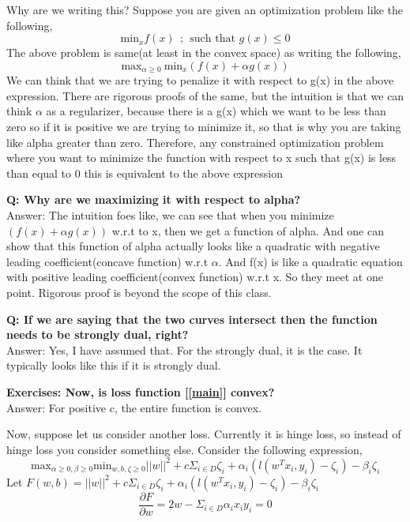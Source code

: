 \documentclass[11pt, twosides]{article}
\begin{document}
Why are we writing this? Suppose you are given an optimization problem like the following, 
\begin{equation*}
    \text{min}_x f(x) \ \ ; \ \ \text{such that } g(x) \leq 0
\end{equation*}
The above problem is same(at least in the convex space) as writing the following,
\begin{equation}
    \text{max}_{\alpha\geq 0} \ \text{min}_x (f(x) + \alpha g(x))
\end{equation} 
We can think that we are trying to penalize it with respect to g(x) in the above expression. There are rigorous proofs of the same, but the intuition is that we can think $\alpha$ as a regularizer, because there is a g(x) which we want to be less than zero so if it is positive we are trying to minimize it, so that is why you are taking like alpha greater than zero. Therefore, any constrained optimization problem where you want to minimize the function with respect to x such that g(x) is less than equal to 0 this is equivalent to the above expression

\textbf{Q: Why are we maximizing it with respect to alpha?} \\
Answer: \color{blue} The intuition foes like, we can see that when you minimize $(f(x) + \alpha g(x))$ w.r.t to x, then we get a function of alpha. And one can show that this function of alpha actually looks like a quadratic with negative leading coefficient(concave function) w.r.t $\alpha$. And f(x) is like a quadratic equation with positive leading coefficient(convex function) w.r.t x. So they meet at one point. Rigorous proof is beyond the scope of this class.
\color{black}

\textbf{Q: If we are saying that the two curves intersect then the function needs to be strongly dual, right? } \\
Answer: \color{blue} Yes, I have assumed that. For the strongly dual, it is the case. It typically looks like this if it is strongly dual.
\color{black}

\textbf{Exercises: Now, is loss function [\ref{main}] convex?} \\
Answer: \color{blue} For positive c, the entire function is convex.

\color{black}

Now, suppose let us consider another loss. Currently it is hinge loss, so instead of hinge loss you consider something else. Consider the following expression,
\begin{equation}
    \text{max}_{\alpha\geq 0, \beta \geq 0} \text{min}_{w,b,\zeta\geq 0} ||w||^2 + c\Sigma_{i\in D}\zeta_i + \alpha_i(l(w^T x_i,y_i)- \zeta_i) - \beta_i\zeta_i
\end{equation}
Let $F(w,b)=||w||^2 + c\Sigma_{i\in D}\zeta_i + \alpha_i(l(w^T x_i,y_i)- \zeta_i) - \beta_i\zeta_i$
\begin{equation}
    \frac{\partial F}{\partial w}=2w-\Sigma_{i\in D} \alpha_ix_{i}y_i=0
\end{equation}
\end{document}
